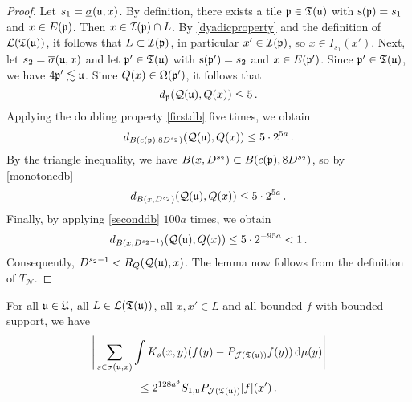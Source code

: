 \begin{proof}
    \leanok
    Let $s_1 = \underline{\sigma}({\mathfrak u}, x)$. By definition, there exists a tile ${\mathfrak p} \in {\mathfrak T}({\mathfrak u})$ with ${\mathrm{s}}({\mathfrak p}) = s_1$ and $x \in E({\mathfrak p})$. Then $x \in {\mathcal{I}}({\mathfrak p}) \cap L$. By \eqref{dyadicproperty} and the definition of $\mathcal{L}({\mathfrak T}({\mathfrak u}))$, it follows that $L \subset {\mathcal{I}}({\mathfrak p})$, in particular $x' \in {\mathcal{I}}({\mathfrak p})$, so $x \in I_{s_1}(x')$.
    Next, let $s_2 = \overline{\sigma}({\mathfrak u}, x)$ and let ${\mathfrak p}' \in {\mathfrak T}({\mathfrak u})$ with ${\mathrm{s}}({\mathfrak p}') = s_2$ and $x \in E({\mathfrak p}')$. Since ${\mathfrak p}' \in {\mathfrak T}({\mathfrak u})$, we have $4{\mathfrak p}' \lesssim {\mathfrak u}$. Since ${Q}(x) \in {\Omega}({\mathfrak p}')$, it follows that
    $$
        d_{{\mathfrak p}}({\mathcal{Q}}({\mathfrak u}), {Q}(x)) \le 5\,.
    $$
    Applying the doubling property \eqref{firstdb} five times, we obtain
    $$
        d_{B(c({\mathfrak p}), 8D^{s_2})}({\mathcal{Q}}({\mathfrak u}), {Q}(x)) \le 5 \cdot 2^{5a}\,.
    $$
    By the triangle inequality, we have $B(x, D^{s_2}) \subset B(c({\mathfrak p}), 8 D^{s_2})$, so by \eqref{monotonedb}
    $$
        d_{B(x, D^{s_2})}({\mathcal{Q}}({\mathfrak u}), {Q}(x)) \le 5 \cdot 2^{5a}\,.
    $$
    Finally, by applying \eqref{seconddb} $100a$ times, we obtain
    $$
        d_{B(x, D^{s_2-1})}({\mathcal{Q}}({\mathfrak u}), {Q}(x)) \le 5 \cdot 2^{-95a} < 1\,.
    $$
    Consequently, $D^{s_2 - 1} < R_Q({\mathcal{Q}}({\mathfrak u}), x)$.
    The lemma now follows from the definition of $T_{\mathcal{N}}$.
\end{proof}

\begin{lemma}
    \label{third-tree-pointwise}
    \leanok
    For all ${\mathfrak u} \in {\mathfrak U}$, all $L \in \mathcal{L}({\mathfrak T}({\mathfrak u}))$, all $x, x' \in L$ and all bounded $f$ with bounded support, we have
    \begin{equation*}
        \Bigg| \sum_{s \in \sigma({\mathfrak u}, x)} \int K_s(x,y) (f(y) - P_{\mathcal{J}({\mathfrak T}({\mathfrak u}))} f(y)) \, \mathrm{d}\mu(y) \Bigg|
    \end{equation*}
    \begin{equation*}
          \le 2^{128a^3} S_{1,{\mathfrak u}} P_{\mathcal{J}({\mathfrak T}({\mathfrak u}))}|f|(x')\,.
    \end{equation*}
\end{lemma}

